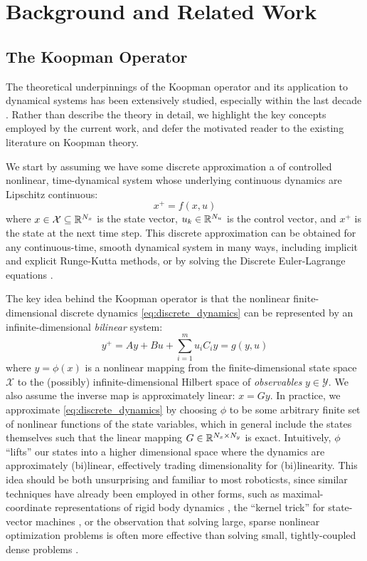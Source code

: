 \documentclass{article}
\begin{document}
\section{Background and Related Work} \label{sec:Preliminaries/Background}

\subsection{The Koopman Operator}
The theoretical underpinnings of the Koopman operator and its application to dynamical
systems has been extensively studied, especially within the last decade 
\cite{Fasel2021,Proctor2018,Bruder2021,Williams2015}. Rather than describe the theory in
detail, we highlight the key concepts employed by the current work, and defer the
motivated reader to the existing literature on Koopman theory.

We start by assuming we have some discrete approximation a of controlled nonlinear,
time-dynamical system whose underlying continuous dynamics are Lipschitz continuous:
\begin{equation} \label{eq:discrete_dynamics} 
  x^+ = f(x, u) 
\end{equation} 
where $x \in \mathcal{X} \subseteq \mathbb{R}^{N_x}$ is the state vector, $u_k \in \mathbb{R}^{N_u}$ is
the control vector, and $x^+$ is the state at the next time step. This discrete
approximation can be obtained for any continuous-time, smooth dynamical system in many
ways, including implicit and explicit Runge-Kutta methods, or by solving the Discrete
Euler-Lagrange equations \cite{Brudigam2021a,Brudigam2021,Howell2022}.

The key idea behind the Koopman operator is that the nonlinear finite-dimensional discrete
dynamics \eqref{eq:discrete_dynamics} can be represented by an infinite-dimensional
\textit{bilinear} system:
\begin{equation} \label{eq:bilinear_dynamics}
  y^+ = A y + B u + \sum_{i=1}^m u_i C_i y = g(y,u)
\end{equation}
where $y = \phi(x)$ is a nonlinear mapping from the finite-dimensional state space
$\mathcal{X}$ to the (possibly) infinite-dimensional Hilbert space of \textit{observables}
$y \in \mathcal{Y}$. We also assume the inverse map is approximately linear: $x = G y$. In
practice, we approximate \eqref{eq:discrete_dynamics} by choosing $\phi$ to be some
arbitrary finite set of nonlinear functions of the state variables, which in general
include the states themselves such that the linear mapping $G \in \mathbb{R}^{N_x \times N_y}$ is
exact.  Intuitively, $\phi$ ``lifts'' our states into a higher dimensional space where the
dynamics are approximately (bi)linear, effectively trading dimensionality for
(bi)linearity. This idea should be both unsurprising and familiar to most roboticsts,
since similar techniques have already been employed in other forms, such as
maximal-coordinate representations of rigid body dynamics
\cite{baraff_linear-time_1996-1,Brudigam2021a,Howell2022}, the
``kernel trick'' for state-vector machines \cite{Hofmann2006}, or the observation that
solving large, sparse nonlinear optimization problems is often more effective than solving
small, tightly-coupled dense problems .
\end{document}
